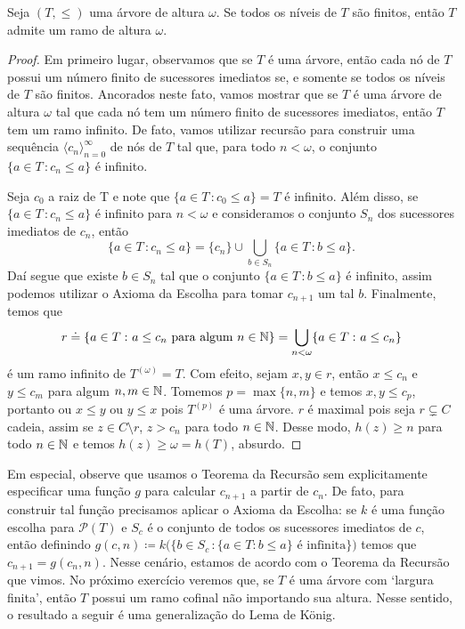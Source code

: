\documentclass[a4paper]{article}
\begin{document}
  \begin{teo}
  Seja \((T,\leq)\) uma árvore de altura \(\omega\). Se todos os níveis de \(T\) são finitos, então
  \(T\) admite um ramo de altura \(\omega\).
  \end{teo}
\begin{proof}
  Em primeiro lugar, observamos que se  \(T\) é uma árvore, então cada nó de \(T\) possui
  um número finito de sucessores imediatos se, e somente se todos os níveis de
  \(T\) são finitos. Ancorados neste fato, vamos mostrar que se \(T\) é uma
  árvore de altura \(\omega\) tal que cada nó tem um número finito de sucessores
  imediatos,  então \(T\) tem um ramo infinito. De fato, vamos utilizar recursão
  para  construir uma sequência \(\langle c_n\rangle_{n=0}^{\infty}\)  de nós de
  \(T\) tal que, para todo \(n<\omega\), o conjunto \(\{a\in T\,\colon c_n\leq a\}\) é
  infinito.

  Seja \(c_0\) a raiz de T e  note que \(\{a \in T\,\colon c_{0} \leq a \}= T\)
  é infinito. Além disso, se \(\{a\in T\,\colon c_n\leq a\}\) é infinito para
  \(n<\omega\) e consideramos  o
  conjunto \(S_n\) dos sucessores imediatos de \(c_n\), então
  \[
  \{a\in T\,\colon c_n\leq a\} = \{c_n\} \cup\bigcup_{b\in S_n} \{a\in T\,\colon b\leq a\}.
  \]
 Daí segue que existe \(b\in S_n\) tal que o conjunto \(\{a\in T\,\colon
 b\leq a\}\) é infinito, assim podemos utilizar o Axioma da Escolha para
 tomar \(c_{n+1}\) um tal \(b\). 
 Finalmente, temos que
  \[r\doteq\{a\in T\,\colon a\leq c_n \text{ para algum }
    n\in\mathbb{N}\}=\bigcup_{n <\omega}\{a\in T\,\colon a\leq c_n\}\]
  é um ramo infinito de \(T^{(\omega)}=T\).
  Com efeito, sejam \(x,y\in r\), então
  \(x\leq c_n\) e \(y\leq c_m\) para algum \(n,m\in\mathbb{N}\).
  Tomemos \(p=\max\{n,m\}\) e temos \(x,y\leq c_p\), portanto ou \(x\leq y\) ou
  \(y\leq x\) pois \(T^{(p)}\) é uma árvore. \(r\) é maximal pois seja
  \(r\subsetneq C\) cadeia, assim se \(z\in C\setminus r\), \(z>c_n\) para todo \(n\in\mathbb{N}\).
  Desse modo, \(h(z)\geq n\) para todo \(n\in\mathbb{N}\) e temos
  \(h(z)\geq\omega=h(T)\), absurdo.
  \end{proof}

    Em especial, observe que usamos o Teorema da Recursão sem
    explicitamente especificar uma função \(g\) para
    calcular \(c_{n+1}\) a partir de \(c_n\). De fato, para construir tal função precisamos
    aplicar o Axioma da Escolha: se \(k\) é uma função escolha para
    \(\mathcal{P}(T)\) e \(S_c\) é o conjunto de todos os sucessores imediatos
    de \(c\), então definindo \(g(c,n) \coloneqq k\big ( \{b\in S_c\,\colon
    \{a\in T: b\leq a\} \text{ é infinita}\}\big )\) temos que \(c_{n+1} =
    g(c_n, n)\). Nesse  cenário, estamos
    de acordo com o Teorema da Recursão que vimos. No próximo exercício veremos que,
    se \(T\) é uma árvore com `largura finita', então \(T\) possui um ramo
    cofinal não importando sua altura. Nesse sentido, o resultado a seguir é uma
    generalização do Lema de König.
  
\end{document}
